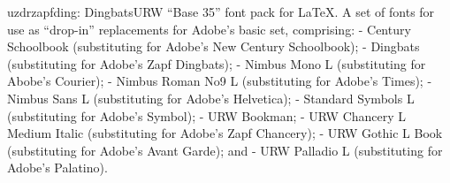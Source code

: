 \documentclass{ddltxtyp}
\begin{document}


\begin{package}{uzdr}{zapfding: Dingbats}{URW ``Base 35'' font pack for {\LaTeX}.}
A set of fonts for use as ``drop-in'' replacements for Adobe's
basic set, comprising: - Century Schoolbook (substituting for
Adobe's New Century Schoolbook); - Dingbats (substituting for
Adobe's Zapf Dingbats); - Nimbus Mono L (substituting for
Abobe's Courier); - Nimbus Roman No9 L (substituting for
Adobe's Times); - Nimbus Sans L (substituting for Adobe's
Helvetica); - Standard Symbols L (substituting for Adobe's
Symbol); - URW Bookman; - URW Chancery L Medium Italic
(substituting for Adobe's Zapf Chancery); - URW Gothic L Book
(substituting for Adobe's Avant Garde); and - URW Palladio L
(substituting for Adobe's Palatino).
\end{package}
\end{document}
